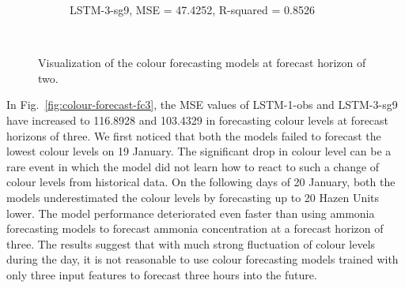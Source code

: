 \begin{figure}[!ht]
\begin{subfigure}[t]{0.7\textwidth}
    \caption{LSTM-3-sg9, MSE = 47.4252, R-squared = 0.8526} \label{fig:colour-lstm-3-fc2}
  \end{subfigure}\\
\caption{Visualization of the colour forecasting models at forecast horizon of two.} \label{fig:colour-forecast-fc2}
\end{figure}

In Fig.~\ref{fig:colour-forecast-fc3}, the MSE values of LSTM-1-obs and LSTM-3-sg9 have increased to 116.8928 and 103.4329 in forecasting colour levels at forecast horizons of three. We first noticed that both the models failed to forecast the lowest colour levels on 19 January. The significant drop in colour level can be a rare event in which the model did not learn how to react to such a change of colour levels from historical data. On the following days of 20 January, both the models underestimated the colour levels by forecasting up to 20 Hazen Units lower. The model performance deteriorated even faster than using ammonia forecasting models to forecast ammonia concentration at a forecast horizon of three. The results suggest that with much strong fluctuation of colour levels during the day, it is not reasonable to use colour forecasting models trained with only three input features to forecast three hours into the future.

